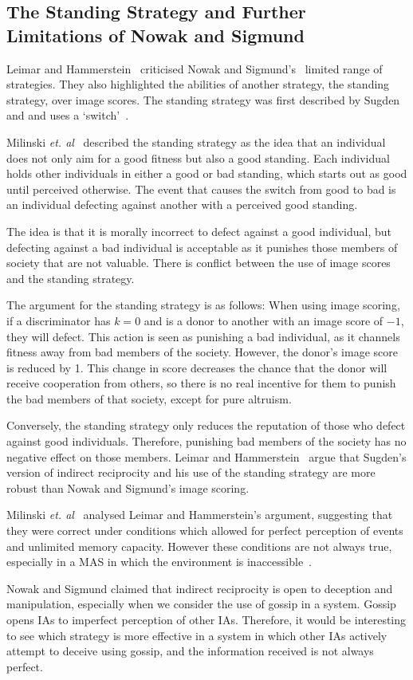 \documentclass[]{final_report}
\begin{document}
\subsection{The Standing Strategy and Further Limitations of Nowak and Sigmund}
Leimar and Hammerstein~\cite{leimarhammer} criticised Nowak and Sigmund's~\cite{evol_indirect_image} limited range of strategies. They also highlighted the abilities of another strategy, the standing strategy, over image scores.  The standing strategy was first described by Sugden~\cite{sugden2004economics} and and uses a `switch'~\cite{evol_indirect_image}.\par
Milinski \textit{et. al}~\cite{imagevsstanding} described the standing strategy as the idea that an individual does not only aim for a good fitness but also a good standing. Each individual holds other individuals in either a good or bad standing, which starts out as good until perceived otherwise. The event that causes the switch from good to bad is an individual defecting against another with a perceived good standing.\par
The idea is that it is morally incorrect to defect against a good individual, but defecting against a bad individual is acceptable as it punishes those members of society that are not valuable. There is conflict between the use of image scores and the standing strategy.\par
The argument for the standing strategy is as follows: When using image scoring, if a discriminator has $k=0$ and is a donor to another with an image score of $-1$, they will defect. This action is seen as punishing a bad individual, as it channels fitness away from bad members of the society. However, the donor's image score is reduced by 1. This change in score decreases the chance that the donor will receive cooperation from others, so there is no real incentive for them to punish the bad members of that society, except for pure altruism.\par
Conversely, the standing strategy only reduces the reputation of those who defect against good individuals. Therefore, punishing bad members of the society has no negative effect on those members. Leimar and Hammerstein~\cite{leimarhammer} argue that Sugden's version of indirect reciprocity and his use of the standing strategy are more robust than Nowak and Sigmund's image scoring.\par
Milinski \textit{et. al}~\cite{imagevsstanding} analysed Leimar and Hammerstein's argument, suggesting that they were correct under conditions which allowed for perfect perception of events and unlimited memory capacity. However these conditions are not always true, especially in a MAS in which the environment is inaccessible~\cite{russell2016artificial}.\par
Nowak and Sigmund claimed that indirect reciprocity is open to deception and manipulation, especially when we consider the use of gossip in a system. Gossip opens IAs to imperfect perception of other IAs. Therefore, it would be interesting to see which strategy is more effective in a system in which other IAs actively attempt to deceive using gossip, and the information received is not always perfect.
\end{document}
